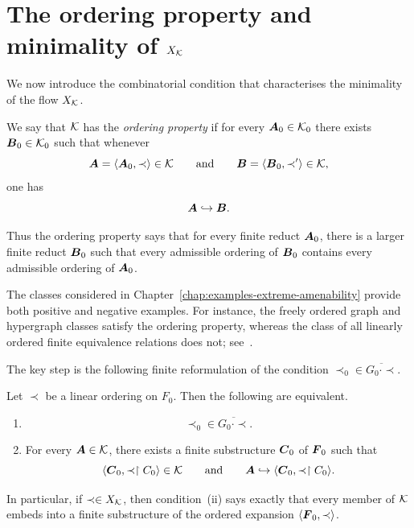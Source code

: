 \section{The ordering property and minimality of \texorpdfstring{\(X_{\mathcal{K}}\)}{X K}}

We now introduce the combinatorial condition that characterises the minimality of the flow \(X_{\mathcal{K}}\).

\begin{definition}
    \label{def:ordering-property}
    We say that \(\mathcal{K}\) has the \emph{ordering property} if for every
    \(\boldsymbol{A}_0\in\mathcal{K}_0\) there exists \(\boldsymbol{B}_0\in\mathcal{K}_0\)
    such that whenever
    \[
        \boldsymbol{A}=\langle \boldsymbol{A}_0,\prec\rangle\in\mathcal{K}
        \qquad\text{and}\qquad
        \boldsymbol{B}=\langle \boldsymbol{B}_0,\prec'\rangle\in\mathcal{K},
    \]
    one has
    \[
        \boldsymbol{A}\hookrightarrow \boldsymbol{B}.
    \]
\end{definition}

Thus the ordering property says that for every finite reduct \(\boldsymbol{A}_0\), there is a larger finite reduct \(\boldsymbol{B}_0\) such that every admissible ordering of \(\boldsymbol{B}_0\) contains every admissible ordering of \(\boldsymbol{A}_0\).

The classes considered in Chapter~\ref{chap:examples-extreme-amenability} provide both positive and negative examples. For instance, the freely ordered graph and hypergraph classes satisfy the ordering property, whereas the class of all linearly ordered finite equivalence relations does not; see~\cite{KPT05}.

The key step is the following finite reformulation of the condition
\(\prec_0\in\overline{G_0\cdot \prec}\).

\begin{lemma}
    \label{lem:orbit-closure-characterization}
    Let \(\prec\) be a linear ordering on \(F_0\). Then the following are equivalent.
    \begin{enumerate}
        \item[(i)]
              \[
                  \prec_0\in\overline{G_0\cdot \prec}.
              \]
        \item[(ii)] For every \(\boldsymbol{A}\in\mathcal{K}\),
              there exists a finite substructure \(\boldsymbol{C}_0\) of \(\boldsymbol{F}_0\) such that
              \[
                  \langle \boldsymbol{C}_0,\prec\restriction C_0\rangle\in\mathcal{K}
                  \qquad\text{and}\qquad
                  \boldsymbol{A}\hookrightarrow \langle \boldsymbol{C}_0,\prec\restriction C_0\rangle.
              \]
    \end{enumerate}
    In particular, if \(\prec\in X_{\mathcal{K}}\), then condition~(ii) says exactly
    that every member of \(\mathcal{K}\) embeds into a finite substructure of the ordered
    expansion \(\langle \boldsymbol{F}_0,\prec\rangle\).
\end{lemma}

